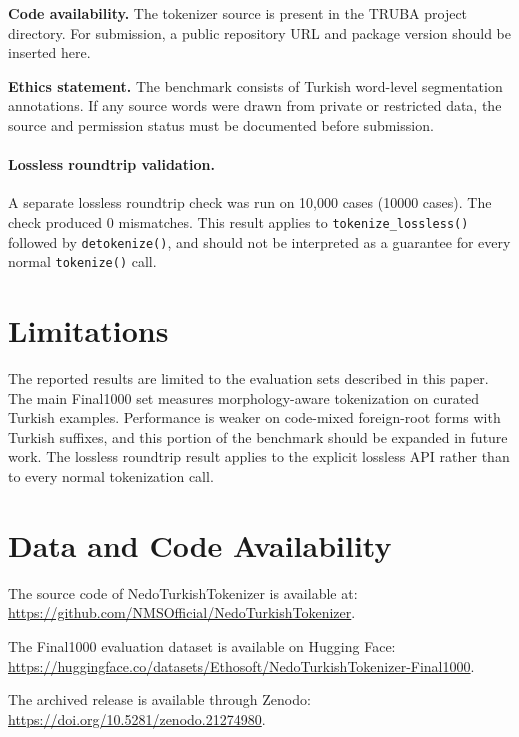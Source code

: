 \documentclass[11pt]{article}
\begin{document}
\textbf{Code availability.} The tokenizer source is present in the TRUBA project directory. For submission, a public repository URL and package version should be inserted here.

\textbf{Ethics statement.} The benchmark consists of Turkish word-level segmentation annotations. If any source words were drawn from private or restricted data, the source and permission status must be documented before submission.



\paragraph{Lossless roundtrip validation.}
A separate lossless roundtrip check was run on 10,000 cases (10000 cases).
The check produced 0 mismatches.
This result applies to \texttt{tokenize\_lossless()} followed by \texttt{detokenize()}, and should not be interpreted as a guarantee for every normal \texttt{tokenize()} call.

\section*{Limitations}

The reported results are limited to the evaluation sets described in this paper.
The main Final1000 set measures morphology-aware tokenization on curated Turkish examples.
Performance is weaker on code-mixed foreign-root forms with Turkish suffixes, and this portion of the benchmark should be expanded in future work.
The lossless roundtrip result applies to the explicit lossless API rather than to every normal tokenization call.

\section*{Data and Code Availability}

The source code of NedoTurkishTokenizer is available at:
\url{https://github.com/NMSOfficial/NedoTurkishTokenizer}.

The Final1000 evaluation dataset is available on Hugging Face:
\url{https://huggingface.co/datasets/Ethosoft/NedoTurkishTokenizer-Final1000}.

The archived release is available through Zenodo:
\url{https://doi.org/10.5281/zenodo.21274980}.
\end{document}
